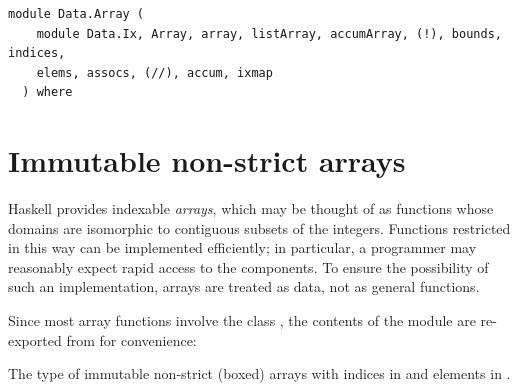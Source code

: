 \label{module:Data.Array}
\haddockbeginheader
{\haddockverb\begin{verbatim}
module Data.Array (
    module Data.Ix, Array, array, listArray, accumArray, (!), bounds, indices,
    elems, assocs, (//), accum, ixmap
  ) where\end{verbatim}}
\haddockendheader

\section{Immutable non-strict arrays}
Haskell provides indexable \emph{arrays}, which may be thought of as
 functions whose domains are isomorphic to contiguous subsets of the
 integers. Functions restricted in this way can be implemented
 efficiently; in particular, a programmer may reasonably expect rapid
 access to the components. To ensure the possibility of such an
 implementation, arrays are treated as data, not as general functions.\par
Since most array functions involve the class , the contents of the
 module  are re-exported from  for convenience:\par
\begin{haddockdesc}
\item[\begin{tabular}{@{}l}
module Data.Ix
\end{tabular}]
\end{haddockdesc}
\begin{haddockdesc}
\item[\begin{tabular}{@{}l}
data Array i e
\end{tabular}]
{\haddockbegindoc
The type of immutable non-strict (boxed) arrays
 with indices in  and elements in .\par}
\end{haddockdesc}
\begin{haddockdesc}
\item[\begin{tabular}{@{}l}
instance Functor Array i\\instance (Ix a, Read a, Read b) => Read Array a b\\instance (Ix a, Show a, Show b) => Show Array a b\\instance (Ix i, Eq e) => Eq Array i e\\instance (Ix i, Ord e) => Ord Array i e
\end{tabular}]
\end{haddockdesc}
